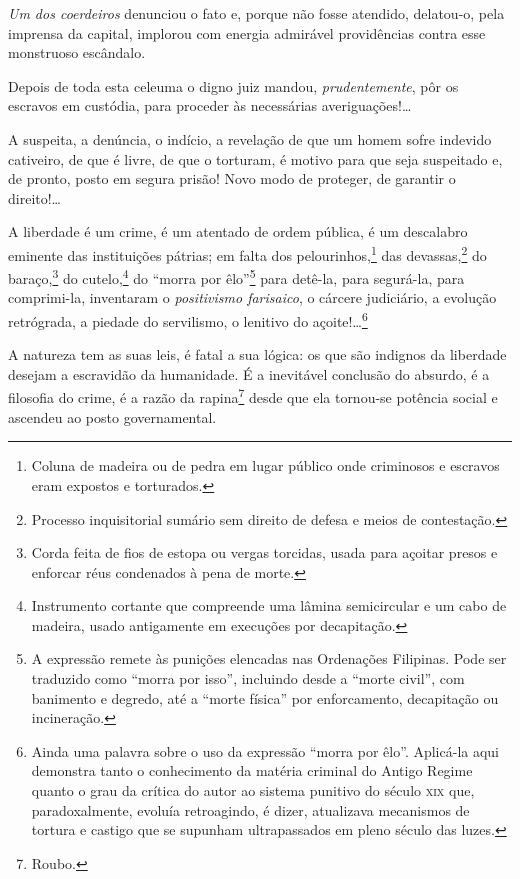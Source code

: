\emph{Um dos coerdeiros} denunciou o fato e, porque não fosse atendido,
delatou-o, pela imprensa da capital, implorou com energia admirável
providências contra esse monstruoso escândalo.

Depois de toda esta celeuma o digno juiz mandou, \emph{prudentemente},
pôr os escravos em custódia, para proceder às necessárias
averiguações!\ldots{}

A suspeita, a denúncia, o indício, a revelação de que um homem sofre
indevido cativeiro, de que é livre, de que o torturam, é motivo para que
seja suspeitado e, de pronto, posto em segura prisão! Novo modo de
proteger, de garantir o direito!\ldots{}

A liberdade é um crime, é um atentado de ordem pública, é um descalabro
eminente das instituições pátrias; em falta dos pelourinhos,\footnote{
  Coluna de madeira ou de pedra em lugar público onde criminosos e
  escravos eram expostos e torturados.} das devassas,\footnote{
  Processo inquisitorial sumário sem direito de defesa e meios de
  contestação.} do baraço,\footnote{Corda feita de fios de estopa ou
  vergas torcidas, usada para açoitar presos e enforcar réus condenados
  à pena de morte.} do cutelo,\footnote{Instrumento cortante que
  compreende uma lâmina semicircular e um cabo de madeira, usado
  antigamente em execuções por decapitação.} do ``morra por
êlo''\footnote{A expressão remete às punições elencadas nas Ordenações
  Filipinas. Pode ser traduzido como ``morra por isso'', incluindo desde a
  ``morte civil'', com banimento e degredo, até a ``morte física'' por
  enforcamento, decapitação ou incineração.} para detê-la, para
segurá-la, para comprimi-la, inventaram o \emph{positivismo farisaico},
o cárcere judiciário, a evolução retrógrada, a piedade do servilismo, o
lenitivo do açoite!\ldots{}\footnote{Ainda uma palavra sobre o uso
  da expressão ``morra por êlo''. Aplicá-la aqui demonstra tanto o
  conhecimento da matéria criminal do Antigo Regime quanto o grau da
  crítica do autor ao sistema punitivo do século \textsc{xix} que,
  paradoxalmente, evoluía retroagindo, é dizer, atualizava mecanismos de
  tortura e castigo que se supunham ultrapassados em pleno século das
  luzes.}

A natureza tem as suas leis, é fatal a sua lógica: os que são indignos
da liberdade desejam a escravidão da humanidade. É a inevitável
conclusão do absurdo, é a filosofia do crime, é a razão da
rapina\footnote{Roubo.} desde que ela tornou-se potência social e
ascendeu ao posto governamental.

